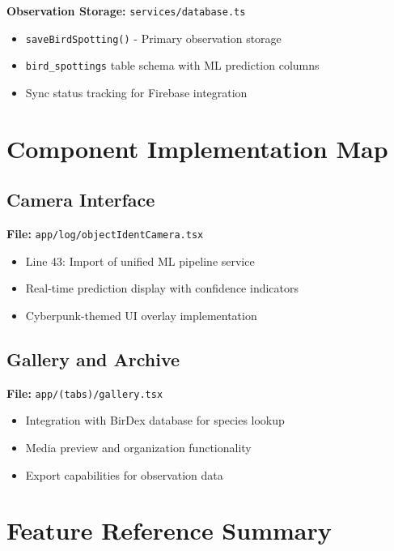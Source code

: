 \textbf{Observation Storage:} \texttt{services/database.ts}
\begin{itemize}
    \item \texttt{saveBirdSpotting()} - Primary observation storage
    \item \texttt{bird\_spottings} table schema with ML prediction columns
    \item Sync status tracking for Firebase integration
\end{itemize}

\section{Component Implementation Map}

\subsection{Camera Interface}
\textbf{File:} \texttt{app/log/objectIdentCamera.tsx}
\begin{itemize}
    \item Line 43: Import of unified ML pipeline service
    \item Real-time prediction display with confidence indicators
    \item Cyberpunk-themed UI overlay implementation
\end{itemize}

\subsection{Gallery and Archive}
\textbf{File:} \texttt{app/(tabs)/gallery.tsx}
\begin{itemize}
    \item Integration with BirDex database for species lookup
    \item Media preview and organization functionality
    \item Export capabilities for observation data
\end{itemize}

\section{Feature Reference Summary}

